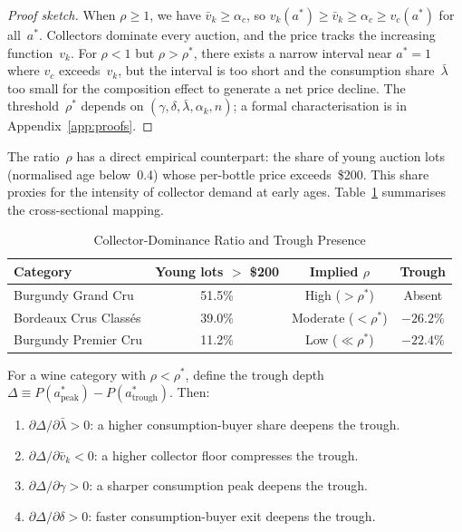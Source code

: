 \begin{proof}[Proof sketch]
When $\rho \geq 1$, we have $\bar{v}_{k} \geq \alpha_{c}$, so
$v_{k}(a^{*}) \geq \bar{v}_{k} \geq \alpha_{c} \geq v_{c}(a^{*})$
for all~$a^{*}$.  Collectors dominate every auction, and the price
tracks the increasing function~$v_{k}$.
For $\rho < 1$ but $\rho > \rho^{*}$, there exists a narrow interval
near $a^{*} = 1$ where $v_{c}$ exceeds~$v_{k}$, but the interval is
too short and the consumption share~$\bar{\lambda}$ too small for
the composition effect to generate a net price decline.
The threshold~$\rho^{*}$ depends on $(\gamma, \delta, \bar{\lambda},
\alpha_{k}, n)$; a formal characterisation is in
Appendix~\ref{app:proofs}.
\end{proof}

\noindent
The ratio~$\rho$ has a direct empirical counterpart: the share of
young auction lots (normalised age below~0.4) whose per-bottle price
exceeds~\$200.  This share proxies for the intensity of collector
demand at early ages.  Table~\ref{tab:rho_mapping} summarises the
cross-sectional mapping.

\begin{table}[htbp]
\centering
\caption{Collector-Dominance Ratio and Trough Presence}
\label{tab:rho_mapping}
\begin{tabular}{lccc}
\toprule
Category & Young lots $>$ \$200 & Implied $\rho$ & Trough \\
\midrule
Burgundy Grand Cru     & 51.5\% & High ($> \rho^{*}$) & Absent \\
Bordeaux Crus Class\'es & 39.0\% & Moderate ($< \rho^{*}$) & $-26.2\%$ \\
Burgundy Premier Cru   & 11.2\% & Low ($\ll \rho^{*}$) & $-22.4\%$ \\
\bottomrule
\end{tabular}
\end{table}

\begin{proposition}
\label{prop:compstat}
For a wine category with $\rho < \rho^{*}$, define the trough depth
$\Delta \equiv P(a^{*}_{\mathrm{peak}}) -
P(a^{*}_{\mathrm{trough}})$.  Then:
\begin{enumerate}
  \item[\emph{(i)}]
    $\partial \Delta / \partial \bar{\lambda} > 0$: a higher
    consumption-buyer share deepens the trough.
  \item[\emph{(ii)}]
    $\partial \Delta / \partial \bar{v}_{k} < 0$: a higher collector
    floor compresses the trough.
  \item[\emph{(iii)}]
    $\partial \Delta / \partial \gamma > 0$: a sharper consumption
    peak deepens the trough.
  \item[\emph{(iv)}]
    $\partial \Delta / \partial \delta > 0$: faster consumption-buyer
    exit deepens the trough.
\end{enumerate}
\end{proposition}

